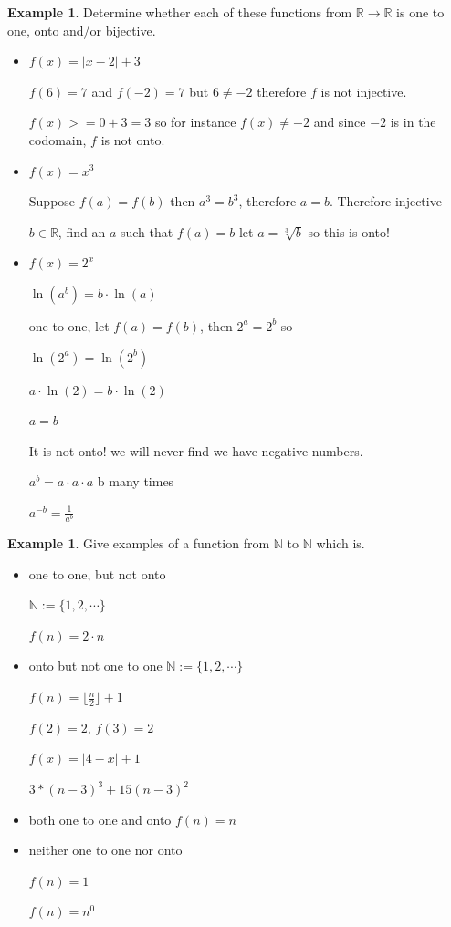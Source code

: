 \documentclass[letterpaper,10pt]{article}
\theoremstyle{plain}
\theoremstyle{definition}
\newtheorem{exmp}[thm]{Example}
\theoremstyle{remark}
\begin{document}
\begin{exmp}
Determine whether each of these functions from $\mathbb{R} \to \mathbb{R}$ is one to one, onto and/or bijective.
\begin{itemize}
\item $f(x)=|x-2|+3$

$f(6)=7$ and $f(-2)=7$ but $6\neq -2 $ therefore $f$ is not injective. 


$f(x)>=0+3=3$ so for instance $f(x)\neq -2$ and since $-2$ is in the codomain, $f$ is not onto.

\item $f(x)=x^3$

Suppose $f(a)=f(b)$ then $a^3=b^3$, therefore $a=b$. Therefore injective

$b \in \mathbb{R}$, find an $a$ such that $f(a)=b$ let $a= \sqrt[3]{b}$ so this is onto!

\item $f(x)=2^x$


$\ln(a^b)=b\cdot \ln(a)$


one to one, let $f(a)=f(b)$, then $2^a=2^b$
so 

$\ln(2^a)=\ln(2^b)$

$a \cdot \ln(2)=b \cdot \ln(2)$

$a=b$

It is not onto! we will never find we have negative numbers.

$a^b=a\cdot a\cdot a$ b many times

$a^{-b}=\frac{1}{a^b}$


\end{itemize}
\end{exmp}
\begin{exmp}
Give examples of a function from $\mathbb{N}$ to $\mathbb{N}$ which is.
\begin{itemize}
\item one to one, but not onto

$\mathbb{N}:=\{1,2, \cdots \}$

$f(n)=2\cdot n$

\item onto but not one to one
$\mathbb{N}:=\{1,2, \cdots \}$

$f(n)=\lfloor \frac{n}{2} \rfloor+1$

$f(2)=2$, $f(3)=2$

$f(x)=|4-x|+1$


$3*(n-3)^3+15(n-3)^2$

\item both one to one and onto
$f(n)=n$



\item neither one to one nor onto

$f(n)=1$

$f(n)=n^0$
\vspace{1cm}
\end{itemize}
\end{exmp}
\end{document}
